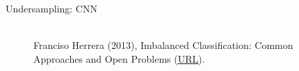 \begin{frame}{Undersampling: CNN}
{\begin{minipage}{0.55\textwidth}
\begin{itemize}
\begin{enumerate}
				\end{enumerate}	
%		
			\end{itemize}			
		\end{minipage}
		\begin{minipage}{0.4\textwidth}
			\begin{figure}
				\centering
							\tiny
				\\ Franciso Herrera (2013), Imbalanced Classification: Common
				Approaches and Open Problems (\href{https://sci2s.ugr.es/sites/default/files/files/TutorialsAndPlenaryTalks/SSTiC-Trends in-Classification-Imbalanced-data-sets.pdf}{\underline{URL}}).
			\end{figure}
		\end{minipage}
	}
	\end{frame}
	
